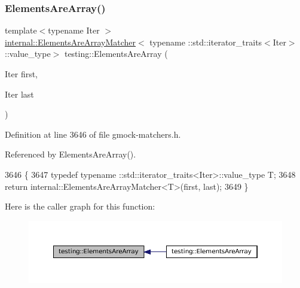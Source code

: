 \subsubsection{\texorpdfstring{Elements\+Are\+Array()}{ElementsAreArray()}\hspace{0.1cm}{\footnotesize\ttfamily [1/4]}}
{\footnotesize\ttfamily template$<$typename Iter $>$ \\
\hyperlink{classtesting_1_1internal_1_1ElementsAreArrayMatcher}{internal\+::\+Elements\+Are\+Array\+Matcher}$<$ typename \+::std\+::iterator\+\_\+traits$<$Iter$>$\+::value\+\_\+type$>$ testing\+::\+Elements\+Are\+Array (\begin{DoxyParamCaption}\item[{Iter}]{first,  }\item[{Iter}]{last }\end{DoxyParamCaption})\hspace{0.3cm}{\ttfamily [inline]}}



Definition at line 3646 of file gmock-\/matchers.\+h.



Referenced by Elements\+Are\+Array().


\begin{DoxyCode}
3646                                         \{
3647   \textcolor{keyword}{typedef} typename ::std::iterator\_traits<Iter>::value\_type T;
3648   \textcolor{keywordflow}{return} internal::ElementsAreArrayMatcher<T>(first, last);
3649 \}
\end{DoxyCode}
Here is the caller graph for this function\+:
\nopagebreak
\begin{figure}[H]
\begin{center}
\leavevmode
\includegraphics[width=350pt]{namespacetesting_ae2eee06e7ddbf5f5372fd24372e9703f_icgraph}
\end{center}
\end{figure}
\mbox{\label{namespacetesting_abf5c2219b4e6a7542368b5f68eadd007}} 
